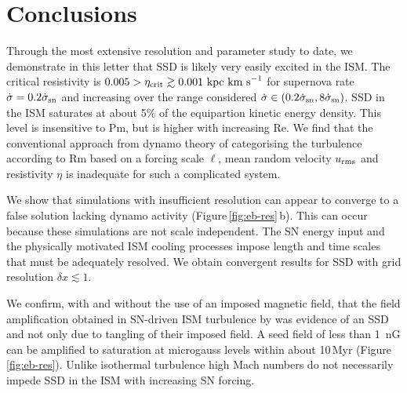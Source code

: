 \documentclass[preprint2]{aastex63}
\newcommand\SNr{\dot\sigma_{\rm sn}}
\newcommand\kpc{~ {\rm kpc}}
\newcommand\pc{~ {\rm pc}}
\newcommand\dx{ {\delta x}}
\newcommand\kms{~ {\rm km~ s}^{-1}}
\newcommand{\fg}[1]{\textcolor{midgreen}{#1}}
\begin{document}

\section{Conclusions}\label{sec:conc}

 \fg{Through the most extensive resolution and parameter study to date, we
 demonstrate in this letter that SSD is likely very easily excited in
 the ISM.
 The critical resistivity is $0.005>\eta_{\rm crit}\gtrsim0.001\kpc\kms$ for 
 supernova rate $\dot \sigma=0.2\SNr$ and increasing over the 
 range considered $\dot \sigma\in(0.2\SNr,8\SNr)$.
 SSD in the ISM saturates at about 5\% of the equipartion kinetic energy
 density.
 This level is insensitive to Pm, but is higher with increasing Re.}
 We find that the conventional approach from dynamo theory of categorising the 
 turbulence according to Rm based on a forcing scale $\ell$, mean random
 velocity $u_{\rm rms}$ and resistivity $\eta$ is inadequate for such a
 complicated system.

 We show that simulations with insufficient resolution can appear to
 converge to a false solution lacking dynamo activity
 (Figure\,\ref{fig:eb-res}\,b). This can occur because these simulations are not
 scale independent. 
 The SN energy input and the physically motivated ISM cooling processes impose
 length and time scales that must be adequately resolved.
 \fg{We obtain convergent results for SSD with grid resolution
 $\dx\lesssim1$.}

 \fg{We confirm, with and without the use of an imposed magnetic field, that
 the field amplification obtained in SN-driven ISM turbulence by \citet{BKMM04}
 was evidence of an SSD and not only due to tangling of their imposed field.}
 A seed field of less than 1~nG can be amplified to saturation at microgauss
 levels within about 10\,Myr (Figure\,\ref{fig:eb-res}). 
 Unlike isothermal turbulence high Mach numbers do not necessarily impede SSD
 in the ISM with increasing SN forcing.
\end{document}
